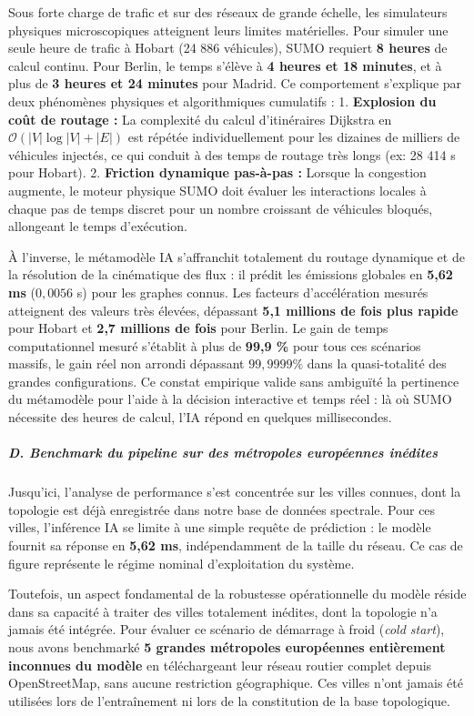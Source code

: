 \documentclass[10pt, a4paper]{article}
\begin{document}
Sous forte charge de trafic et sur des réseaux de grande échelle, les
simulateurs physiques microscopiques atteignent leurs limites
matérielles. Pour simuler une seule heure de trafic à Hobart (24 886
véhicules), SUMO requiert \textbf{8 heures} de calcul continu. Pour
Berlin, le temps s'élève à \textbf{4 heures et 18 minutes}, et à plus de
\textbf{3 heures et 24 minutes} pour Madrid. Ce comportement s'explique
par deux phénomènes physiques et algorithmiques cumulatifs : 1.
\textbf{Explosion du coût de routage :} La complexité du calcul
d'itinéraires Dijkstra en \(\mathcal{O}(|V| \log |V| + |E|)\) est
répétée individuellement pour les dizaines de milliers de véhicules
injectés, ce qui conduit à des temps de routage très longs (ex: 28 414 s
pour Hobart). 2. \textbf{Friction dynamique pas-à-pas :} Lorsque la
congestion augmente, le moteur physique SUMO doit évaluer les
interactions locales à chaque pas de temps discret pour un nombre
croissant de véhicules bloqués, allongeant le temps d'exécution.

À l'inverse, le métamodèle IA s'affranchit totalement du routage
dynamique et de la résolution de la cinématique des flux : il prédit les
émissions globales en \textbf{5,62 ms} (\(0,0056\) s) pour les graphes
connus. Les facteurs d'accélération mesurés atteignent des valeurs très
élevées, dépassant \textbf{5,1 millions de fois plus rapide} pour Hobart
et \textbf{2,7 millions de fois} pour Berlin. Le gain de temps
computationnel mesuré s'établit à plus de \textbf{99,9 \%} pour tous ces
scénarios massifs, le gain réel non arrondi dépassant \(99{,}9999\%\)
dans la quasi-totalité des grandes configurations. Ce constat empirique
valide sans ambiguïté la pertinence du métamodèle pour l'aide à la
décision interactive et temps réel : là où SUMO nécessite des heures de
calcul, l'IA répond en quelques millisecondes.

\subparagraph{D. Benchmark du pipeline sur des métropoles européennes
inédites}\label{d.-benchmark-du-pipeline-sur-des-muxe9tropoles-europuxe9ennes-inuxe9dites}

Jusqu'ici, l'analyse de performance s'est concentrée sur les villes
connues, dont la topologie est déjà enregistrée dans notre base de
données spectrale. Pour ces villes, l'inférence IA se limite à une
simple requête de prédiction : le modèle fournit sa réponse en
\textbf{5,62 ms}, indépendamment de la taille du réseau. Ce cas de
figure représente le régime nominal d'exploitation du système.

Toutefois, un aspect fondamental de la robustesse opérationnelle du
modèle réside dans sa capacité à traiter des villes totalement inédites,
dont la topologie n'a jamais été intégrée. Pour évaluer ce scénario de
démarrage à froid (\emph{cold start}), nous avons benchmarké \textbf{5
grandes métropoles européennes entièrement inconnues du modèle} en
téléchargeant leur réseau routier complet depuis OpenStreetMap, sans
aucune restriction géographique. Ces villes n'ont jamais été utilisées
lors de l'entraînement ni lors de la constitution de la base
topologique.
\end{document}
